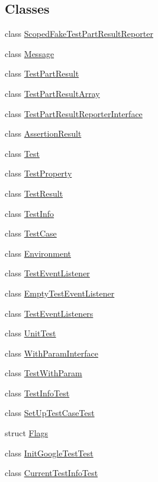 \subsection*{Classes}
\begin{DoxyCompactItemize}
\item 
class \hyperlink{classtesting_1_1_scoped_fake_test_part_result_reporter}{Scoped\-Fake\-Test\-Part\-Result\-Reporter}
\item 
class \hyperlink{classtesting_1_1_message}{Message}
\item 
class \hyperlink{classtesting_1_1_test_part_result}{Test\-Part\-Result}
\item 
class \hyperlink{classtesting_1_1_test_part_result_array}{Test\-Part\-Result\-Array}
\item 
class \hyperlink{classtesting_1_1_test_part_result_reporter_interface}{Test\-Part\-Result\-Reporter\-Interface}
\item 
class \hyperlink{classtesting_1_1_assertion_result}{Assertion\-Result}
\item 
class \hyperlink{classtesting_1_1_test}{Test}
\item 
class \hyperlink{classtesting_1_1_test_property}{Test\-Property}
\item 
class \hyperlink{classtesting_1_1_test_result}{Test\-Result}
\item 
class \hyperlink{classtesting_1_1_test_info}{Test\-Info}
\item 
class \hyperlink{classtesting_1_1_test_case}{Test\-Case}
\item 
class \hyperlink{classtesting_1_1_environment}{Environment}
\item 
class \hyperlink{classtesting_1_1_test_event_listener}{Test\-Event\-Listener}
\item 
class \hyperlink{classtesting_1_1_empty_test_event_listener}{Empty\-Test\-Event\-Listener}
\item 
class \hyperlink{classtesting_1_1_test_event_listeners}{Test\-Event\-Listeners}
\item 
class \hyperlink{classtesting_1_1_unit_test}{Unit\-Test}
\item 
class \hyperlink{classtesting_1_1_with_param_interface}{With\-Param\-Interface}
\item 
class \hyperlink{classtesting_1_1_test_with_param}{Test\-With\-Param}
\item 
class \hyperlink{classtesting_1_1_test_info_test}{Test\-Info\-Test}
\item 
class \hyperlink{classtesting_1_1_set_up_test_case_test}{Set\-Up\-Test\-Case\-Test}
\item 
struct \hyperlink{structtesting_1_1_flags}{Flags}
\item 
class \hyperlink{classtesting_1_1_init_google_test_test}{Init\-Google\-Test\-Test}
\item 
class \hyperlink{classtesting_1_1_current_test_info_test}{Current\-Test\-Info\-Test}
\end{DoxyCompactItemize}
